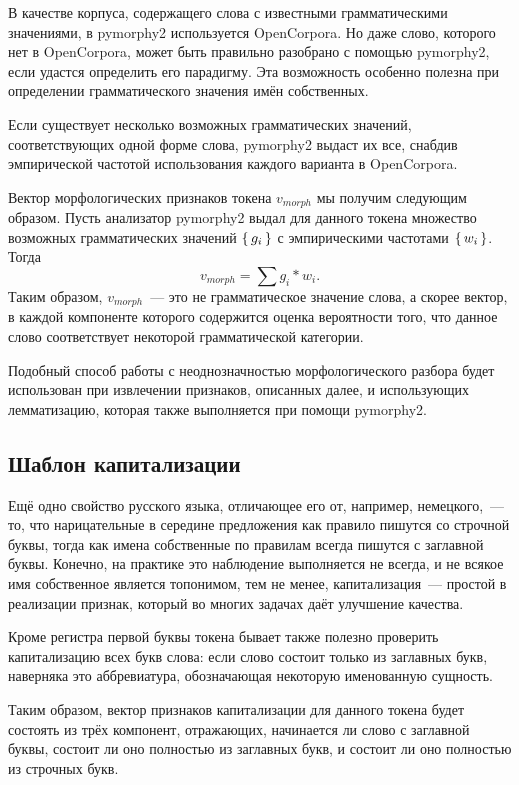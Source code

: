 \documentclass[14pt,russian]{extreport}
\begin{document}
В качестве корпуса, содержащего слова с известными грамматическими значениями,
в pymorphy2 используется OpenCorpora. Но даже слово, которого нет в
OpenCorpora, может быть правильно разобрано с помощью pymorphy2, если удастся
определить его парадигму. Эта возможность особенно полезна при определении
грамматического значения имён собственных.

Если существует несколько возможных грамматических значений, соответствующих
одной форме слова, pymorphy2 выдаст их все, снабдив эмпирической частотой
использования каждого варианта в OpenCorpora.

Вектор морфологических признаков токена $v_{morph}$ мы получим следующим
образом. Пусть анализатор pymorphy2 выдал для данного токена множество
возможных грамматических значений $\set{g_i}$ с эмпирическими частотами
$\set{w_i}$. Тогда $$v_{morph} = \sum g_i * w_i.$$ Таким образом, $v_{morph}$~---
это не грамматическое значение слова, а скорее вектор, в каждой компоненте
которого содержится оценка вероятности того, что данное слово соответствует
некоторой грамматической категории.

Подобный способ работы с неоднозначностью морфологического разбора будет
использован при извлечении признаков, описанных далее, и использующих
лемматизацию, которая также выполняется при помощи pymorphy2.

\subsection{Шаблон капитализации}

Ещё одно свойство русского языка, отличающее его от, например, немецкого,~---
то, что нарицательные в середине предложения как правило пишутся со строчной
буквы, тогда как имена собственные по правилам всегда пишутся с заглавной
буквы. Конечно, на практике это наблюдение выполняется не всегда, и не всякое
имя собственное является топонимом, тем не менее, капитализация~--- простой в
реализации признак, который во многих задачах даёт улучшение качества\cite{Ritter:2011:NER:2145432.2145595}.

Кроме регистра первой буквы токена бывает также полезно проверить капитализацию
всех букв слова: если слово состоит только из заглавных букв, наверняка это
аббревиатура, обозначающая некоторую именованную сущность.

Таким образом, вектор признаков капитализации для данного токена будет состоять
из трёх компонент, отражающих, начинается ли слово с заглавной буквы, состоит
ли оно полностью из заглавных букв, и состоит ли оно полностью из строчных
букв.
\end{document}
